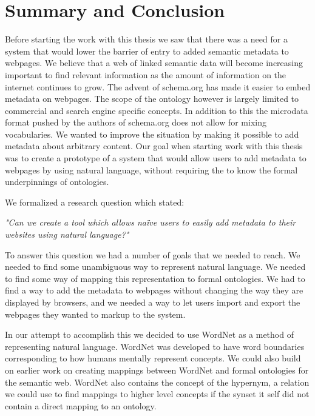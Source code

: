 
\chapter{Summary and Conclusion} %
\label{Conclusion} %
Before starting the work with this thesis we saw that there was a need for a system that would lower the barrier of
entry to added semantic metadata to webpages.
We believe that a web of linked semantic data will become increasing important to find relevant information as the amount
of information on the internet continues to grow.
The advent of schema.org has made it easier to embed metadata on webpages.
The scope of the ontology however is largely limited to commercial and search engine specific concepts.
In addition to this the microdata format pushed by the authors of schema.org does not allow for mixing vocabularies.
We wanted to improve the situation by making it possible to add metadata about arbitrary content.
Our goal when starting work with this thesis was to create a prototype of a system that would allow users to add metadata to webpages by using natural language,
without requiring the to know the formal underpinnings of ontologies.

We formalized a research question which stated:

\emph{"Can we create a tool which allows naïve users to easily add metadata to their websites using natural language?"}

To answer this question we had a number of goals that we needed to reach.
We needed to find some unambiguous way to represent natural language.
We needed to find some way of mapping this representation to formal ontologies.
We had to find a way to add the metadata to webpages without changing the way they are displayed by browsers,
and we needed a way to let users import and export the webpages they wanted to markup to the system.

In our attempt to accomplish this we decided to use WordNet as a method of representing natural language.
WordNet was developed to have word boundaries corresponding to how humans mentally represent concepts.
We could also build on earlier work on creating mappings between WordNet and formal ontologies for the semantic web.
WordNet also contains the concept of the hypernym, a relation we could use to find mappings to higher level concepts
if the synset it self did not contain a direct mapping to an ontology.

